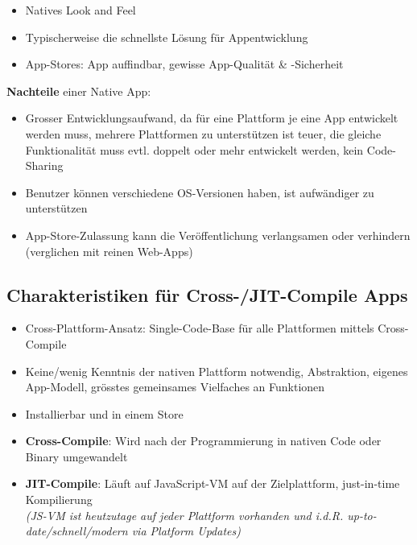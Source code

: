 \documentclass[a4paper]{article}
\begin{document}
{\begin{itemize}
		\item Natives Look and Feel
		
		\item Typischerweise die schnellste Lösung für Appentwicklung
		
		\item App-Stores: App auffindbar, gewisse App-Qualität \& -Sicherheit
		
	\end{itemize}
	\vspace{1em}
	\textbf{Nachteile} einer Native App:
	\begin{itemize}
		
		\item Grosser Entwicklungsaufwand, da für eine Plattform je eine App entwickelt werden muss, mehrere Plattformen zu unterstützen ist teuer, die gleiche Funktionalität muss evtl. doppelt oder mehr entwickelt werden, kein Code-Sharing
		
		\item Benutzer können verschiedene OS-Versionen haben, ist aufwändiger zu unterstützen
		
		\item App-Store-Zulassung kann die Veröffentlichung verlangsamen oder verhindern (verglichen mit reinen Web-Apps)
		
	\end{itemize}

	\subsection{Charakteristiken für Cross-/JIT-Compile Apps}
	
	\begin{itemize}

		\item Cross-Plattform-Ansatz: Single-Code-Base für alle Plattformen mittels Cross-Compile
		
		\item Keine/wenig Kenntnis der nativen Plattform notwendig, Abstraktion, eigenes App-Modell, grösstes gemeinsames Vielfaches an Funktionen
		
		\item Installierbar und in einem Store
		
		\item \textbf{Cross-Compile}: Wird nach der Programmierung in nativen Code oder Binary umgewandelt
		
		\item \textbf{JIT-Compile}: Läuft auf JavaScript-VM auf der Zielplattform, just-in-time Kompilierung\\
		\textit{(JS-VM ist heutzutage auf jeder Plattform vorhanden und i.d.R. up-to-date/schnell/modern via Platform Updates)}


\end{itemize}}
\end{document}
